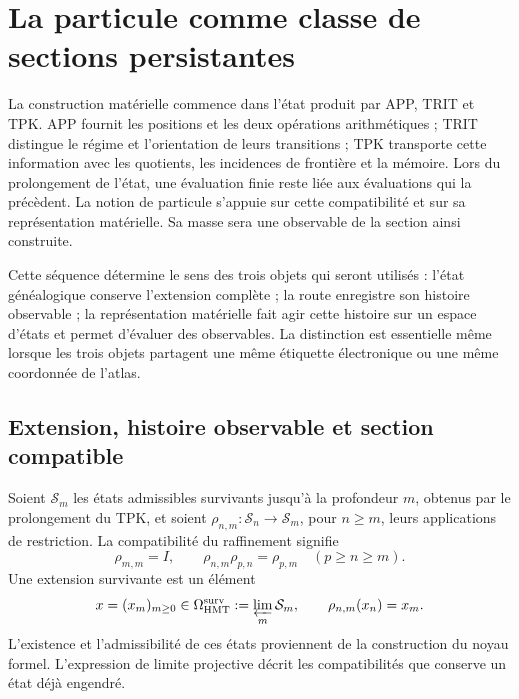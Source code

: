 \section{La particule comme classe de sections persistantes}
\label{vi:vi:sec:particula}

La construction matérielle commence dans l’état produit par APP, TRIT et
TPK. APP fournit les positions et les deux opérations arithmétiques ;
TRIT distingue le régime et l’orientation de leurs transitions ; TPK
transporte cette information avec les quotients, les incidences de
frontière et la mémoire. Lors du prolongement de l’état, une évaluation finie
reste liée aux évaluations qui la précèdent. La notion de
particule s’appuie sur cette compatibilité et sur sa représentation matérielle.
Sa masse sera une observable de la section ainsi construite.

Cette séquence détermine le sens des trois objets qui seront
utilisés : l’état généalogique conserve l’extension complète ; la route
enregistre son histoire observable ; la représentation matérielle fait agir
cette histoire sur un espace d’états et permet d’évaluer des observables.
La distinction est essentielle même lorsque les trois objets partagent
une même étiquette électronique ou une même coordonnée de l’atlas.

\subsection{Extension, histoire observable et section compatible}
\label{vi:vi:subsec:extension-persistente}

Soient $\mathcal S_m$ les états admissibles survivants jusqu’à la profondeur
$m$, obtenus par le prolongement du TPK, et soient
$\rho_{n,m}:\mathcal S_n\to\mathcal S_m$, pour $n\geq m$, leurs
applications de restriction. La compatibilité du raffinement signifie
\begin{equation}
 \rho_{m,m}=I,\qquad
 \rho_{n,m}\rho_{p,n}=\rho_{p,m}\quad(p\geq n\geq m).
 \label{vi:vi:eq:sistema-estados}
\end{equation}
Une extension survivante est un élément
\begin{equation}
 x=(x_m)_{m\geq0}\in\Omega^{\mathrm{surv}}_{\mathrm{HMT}}
 :=\varprojlim_m\mathcal S_m,
 \qquad \rho_{n,m}(x_n)=x_m.
 \label{vi:vi:eq:extension-superviviente}
\end{equation}
L’existence et l’admissibilité de ces états proviennent de la
construction du noyau formel. L’expression de limite projective décrit
les compatibilités que conserve un état déjà engendré.

